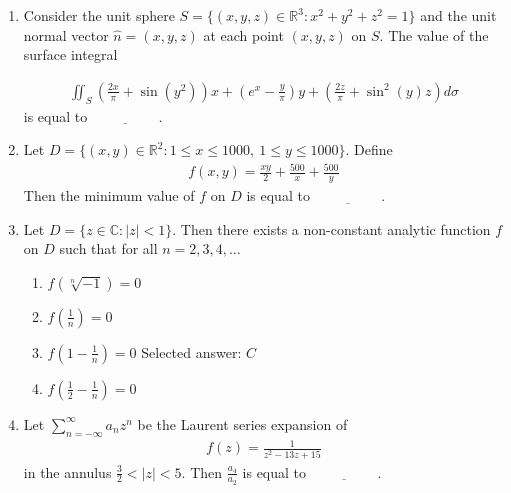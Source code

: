 \documentclass[journal]{IEEEtran}
\numberwithin{equation}{enumi}
\numberwithin{figure}{enumi}
\begin{document}
\begin{enumerate}
\item Consider the unit sphere \( S = \{ (x, y, z) \in \mathbb{R}^3 : x^2 + y^2 + z^2 = 1 \} \) and the unit normal vector \( \hat{n} = (x, y, z) \) at each point \( (x, y, z) \) on \( S \).  
The value of the surface integral

\begin{align*}
\iint_S \left( \frac{2x}{\pi} + \sin(y^2) \right) x + \left( e^x - \frac{y}{\pi} \right) y + \left( \frac{2z}{\pi} + \sin^2(y) z \right) d\sigma
\end{align*}
is equal to \(\underline{\hspace{2cm}}\).
\hfill{}
\vspace{1em}


\item Let \( D = \{ (x, y) \in \mathbb{R}^2 : 1 \leq x \leq 1000, \ 1 \leq y \leq 1000 \} \). Define
\begin{align*}
f(x, y) = \frac{x y}{2} + \frac{500}{x} + \frac{500}{y}
\end{align*}
Then the minimum value of \( f \) on \( D \) is equal to \(\underline{\hspace{2cm}}\).
\hfill{}
\vspace{1em}

\item Let \( D = \{ z \in \mathbb{C} : |z| < 1 \} \). Then there exists a non-constant analytic function \( f \) on \( D \) such that for all \( n = 2, 3, 4, \ldots \)
\hfill{}
\begin{multicols}{2}
\begin{enumerate}
    \item \( f(\sqrt[n]{-1}) = 0 \)
    \item \( f\left(\frac{1}{n}\right) = 0 \)
    \item \( f\left(1 - \frac{1}{n}\right) = 0 \) \hfill Selected answer: \(\boxed{C}\)
    \item \( f\left(\frac{1}{2} - \frac{1}{n}\right) = 0 \)
\end{enumerate}
\end{multicols}


\item Let \(\sum_{n=-\infty}^{\infty} a_n z^n\) be the Laurent series expansion of
\begin{align*}
f(z) = \frac{1}{z^2 - 13z + 15}
\end{align*}
in the annulus \( \frac{3}{2} < |z| < 5 \). Then \( \frac{a_4}{a_2} \) is equal to \(\underline{\hspace{2cm}}\).
\hfill{}
\vspace{1em}


\end{enumerate}
\end{document}
